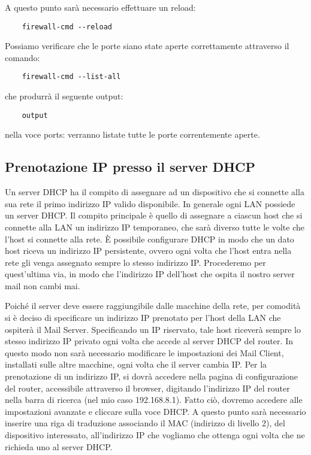 A questo punto sarà necessario effettuare un reload:

\begin{verbatim}
    firewall-cmd --reload
\end{verbatim}

Possiamo verificare che le porte siano state aperte correttamente attraverso il comando:
\begin{verbatim}
    firewall-cmd --list-all
\end{verbatim}

che produrrà il seguente output:
\begin{verbatim}
    output
\end{verbatim}

nella voce ports: verranno listate tutte le porte correntemente aperte.

\subsection{Prenotazione IP presso il server DHCP}
Un server DHCP ha il compito di assegnare ad un dispositivo che si connette alla sua rete il primo indirizzo IP 
valido disponibile. In generale ogni LAN possiede un server DHCP. 
Il compito principale è quello di assegnare a ciascun host che si connette alla LAN un indirizzo IP temporaneo, 
che sarà diverso tutte le volte che l’host si connette alla rete. 
È possibile configurare DHCP in modo che un dato host riceva un indirizzo IP persistente, 
ovvero ogni volta che l’host entra nella rete gli venga assegnato sempre lo stesso indirizzo IP. 
Procederemo per quest’ultima via, in modo che l’indirizzo IP dell’host che ospita il nostro server mail non cambi mai.

Poiché il server deve essere raggiungibile dalle macchine della rete, 
per comodità si è deciso di specificare un indirizzo IP prenotato per l’host della LAN che ospiterà il Mail Server. 
Specificando un IP riservato, tale host riceverà sempre lo stesso indirizzo IP privato ogni volta che accede al 
server DHCP del router. In questo modo non sarà necessario modificare le impostazioni dei Mail Client, 
installati sulle altre macchine, ogni volta che il server cambia IP.
Per la prenotazione di un indirizzo IP, si dovrà accedere nella pagina di configurazione del router, 
accessibile attraverso il browser, digitando l’indirizzo IP del router nella barra di ricerca 
(nel mio caso 192.168.8.1). Fatto ciò, dovremo accedere alle impostazioni avanzate e cliccare sulla voce DHCP. 
A questo punto sarà necessario inserire una riga di traduzione associando il MAC (indirizzo di livello 2), 
del dispositivo interessato, all’indirizzo IP che vogliamo che ottenga ogni volta che ne richieda uno al server DHCP.

